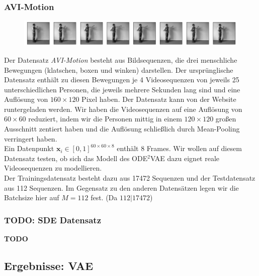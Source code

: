 \documentclass[12pt]{article}
\newcommand{\x}{\mathbf{x}_i}
\begin{document}
	\subsubsection{AVI-Motion}
	\begin{figure}[!htbp]
		\centering
		\includegraphics[scale=0.5]{AVIMotion}
	\end{figure}
	Der Datensatz \emph{AVI-Motion} besteht aus Bildsequenzen, die drei menschliche Bewegungen (klatschen, boxen und winken) darstellen. Der ursprünglische Datensatz enthält zu diesen Bewegungen je 4 Videosequenzen von jeweils 25 unterschiedlichen Personen, die jeweils mehrere Sekunden lang sind und eine Auflösung von $160\times120$ Pixel haben. Der Datensatz kann von der Website \cite{Dataset} runtergeladen werden.
	Wir haben die Videosequenzen auf eine Auflösung von $60\times60$ reduziert, indem wir die Personen mittig in einem $120\times120$ großen Ausschnitt zentiert haben und die Auflösung schließlich durch Mean-Pooling verringert haben. \\
	Ein Datenpunkt $\x\in [0,1]^{60\times 60\times 8}$ enthält 8 Frames. Wir wollen auf diesem Datensatz testen, ob sich das Modell des ODE$^2$VAE dazu eignet reale Videosequenzen zu modellieren.\\
	Der Trainingsdatensatz besteht dazu aus 17472 Sequenzen und der Testdatensatz aus 112 Sequenzen. Im Gegensatz zu den anderen Datensätzen legen wir die Batchsize hier auf $M=112$ fest. (Da $112 | 17472$)

	\subsubsection{TODO: SDE Datensatz}
	\textbf{TODO}
	\newpage
	\subsection[VAE]{Ergebnisse: VAE}






	
\end{document}
